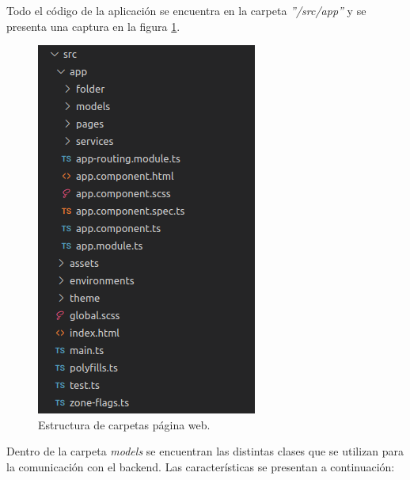 Todo el código de la aplicación se encuentra en la carpeta \textit{''/src/app''} y se presenta una captura en la figura \ref{fig:Carpetas página web.}.


\begin{figure}[ht]
	\centering
	\includegraphics[scale=.60]{./Figures/codigoFront.png}
	\caption{Estructura de carpetas página web.}
	\label{fig:Carpetas página web.}
\end{figure}


Dentro de la carpeta \textit{models} se encuentran las distintas clases que se utilizan para la comunicación con el backend. Las características se presentan a continuación:

